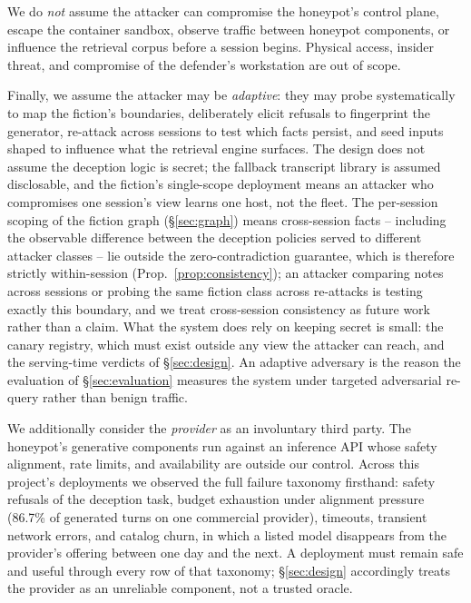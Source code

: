 We do \emph{not} assume the attacker can compromise the honeypot's
control plane, escape the container sandbox, observe traffic between
honeypot components, or influence the retrieval corpus before a session
begins. Physical access, insider threat, and compromise of the defender's
workstation are out of scope.

Finally, we assume the attacker may be \emph{adaptive}: they may probe
systematically to map the fiction's boundaries, deliberately elicit
refusals to fingerprint the generator, re-attack across sessions to test
which facts persist, and seed inputs shaped to influence what the
retrieval engine surfaces. The design does not assume the deception
logic is secret; the fallback transcript library is assumed
disclosable, and the fiction's single-scope deployment means an attacker
who compromises one session's view learns one host, not the fleet. The
per-session scoping of the fiction graph (\S\ref{sec:graph}) means
cross-session facts -- including the observable difference between the
deception policies served to different attacker classes -- lie outside
the zero-contradiction guarantee, which is therefore strictly
within-session (Prop.~\ref{prop:consistency}); an attacker comparing
notes across sessions or probing the same fiction class across
re-attacks is testing exactly this boundary, and we treat cross-session
consistency as future work rather than a claim. What
the system does rely on keeping secret is small: the canary registry,
which must exist outside any view the attacker can reach, and the
serving-time verdicts of \S\ref{sec:design}. An adaptive adversary is
the reason the evaluation of \S\ref{sec:evaluation} measures the system
under targeted adversarial re-query rather than benign traffic.

We additionally consider the \emph{provider} as an involuntary third
party. The honeypot's generative components run against an inference API
whose safety alignment, rate limits, and availability are outside our
control. Across this project's deployments we observed the full failure
taxonomy firsthand: safety refusals of the deception task, budget
exhaustion under alignment pressure (86.7\% of generated turns on one
commercial provider), timeouts, transient network errors, and catalog
churn, in which a listed model disappears from the provider's offering
between one day and the next. A deployment must remain safe and useful
through every row of that taxonomy; \S\ref{sec:design} accordingly treats
the provider as an unreliable component, not a trusted oracle.

